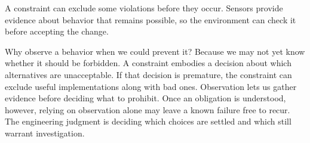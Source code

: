 

A constraint can exclude some violations before they occur. Sensors provide evidence about behavior that remains possible, so the environment can check it before accepting the change.

Why observe a behavior when we could prevent it? Because we may not yet know whether it should be forbidden. A constraint embodies a decision about which alternatives are unacceptable. If that decision is premature, the constraint can exclude useful implementations along with bad ones. Observation lets us gather evidence before deciding what to prohibit. Once an obligation is understood, however, relying on observation alone may leave a known failure free to recur. The engineering judgment is deciding which choices are settled and which still warrant investigation.





